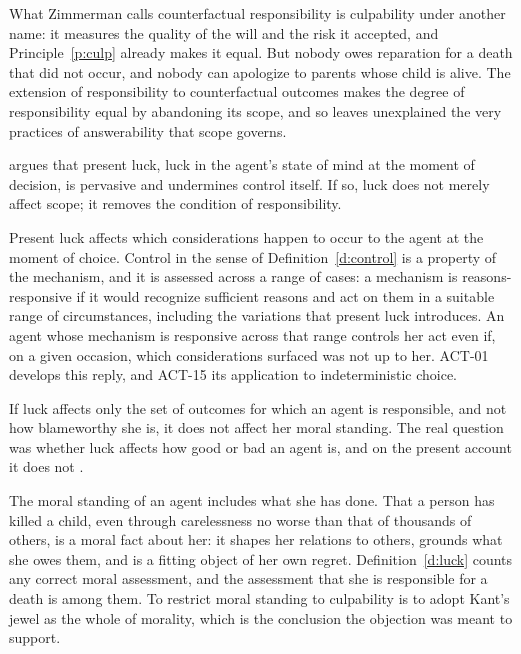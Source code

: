 \documentclass{situationist-preprint}
\begin{document}
\begin{reply}
What Zimmerman calls counterfactual responsibility is culpability under another name: it measures the quality of the will and the risk it accepted, and Principle~\ref{p:culp} already makes it equal. But nobody owes reparation for a death that did not occur, and nobody can apologize to parents whose child is alive. The extension of responsibility to counterfactual outcomes makes the degree of responsibility equal by abandoning its scope, and so leaves unexplained the very practices of answerability that scope governs.
\end{reply}

\begin{objection}
\citet{Levy2011} argues that present luck, luck in the agent's state of mind at the moment of decision, is pervasive and undermines control itself. If so, luck does not merely affect scope; it removes the condition of responsibility.
\end{objection}

\begin{reply}
Present luck affects which considerations happen to occur to the agent at the moment of choice. Control in the sense of Definition~\ref{d:control} is a property of the mechanism, and it is assessed across a range of cases: a mechanism is reasons-responsive if it would recognize sufficient reasons and act on them in a suitable range of circumstances, including the variations that present luck introduces. An agent whose mechanism is responsive across that range controls her act even if, on a given occasion, which considerations surfaced was not up to her. ACT-01 develops this reply, and ACT-15 its application to indeterministic choice.
\end{reply}

\begin{objection}
If luck affects only the set of outcomes for which an agent is responsible, and not how blameworthy she is, it does not affect her moral standing. The real question was whether luck affects how good or bad an agent is, and on the present account it does not \citep{EnochMarmor2007}.
\end{objection}

\begin{reply}
The moral standing of an agent includes what she has done. That a person has killed a child, even through carelessness no worse than that of thousands of others, is a moral fact about her: it shapes her relations to others, grounds what she owes them, and is a fitting object of her own regret. Definition~\ref{d:luck} counts any correct moral assessment, and the assessment that she is responsible for a death is among them. To restrict moral standing to culpability is to adopt Kant's jewel as the whole of morality, which is the conclusion the objection was meant to support.
\end{reply}
\end{document}
